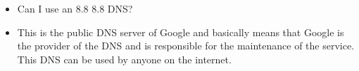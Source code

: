 \setlength{\columnsep}{3pt}
\begin{flushleft}
	\bigskip
	\begin{itemize}
		\item Can I use an 8.8 8.8 DNS?
		\item This is the public DNS server of Google and basically means that Google is the provider of the DNS and is responsible for the maintenance of the service. This DNS can be used by anyone on the internet.
	
	\end{itemize}
\end{flushleft}

\newpage





